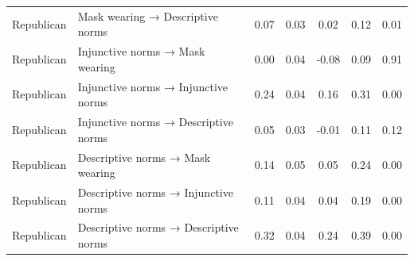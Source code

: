 \documentclass[
  man, donotrepeattitle,floatsintext]{apa6}
\begin{document}
\begin{center}
\begin{ThreePartTable}
\begin{longtable}{llccccc}
Republican & Mask wearing → Descriptive norms & 0.07 & 0.03 & 0.02 & 0.12 & 0.01\\
Republican & Injunctive norms → Mask wearing & 0.00 & 0.04 & -0.08 & 0.09 & 0.91\\
Republican & Injunctive norms → Injunctive norms & 0.24 & 0.04 & 0.16 & 0.31 & 0.00\\
Republican & Injunctive norms → Descriptive norms & 0.05 & 0.03 & -0.01 & 0.11 & 0.12\\
Republican & Descriptive norms → Mask wearing & 0.14 & 0.05 & 0.05 & 0.24 & 0.00\\
Republican & Descriptive norms → Injunctive norms & 0.11 & 0.04 & 0.04 & 0.19 & 0.00\\
Republican & Descriptive norms → Descriptive norms & 0.32 & 0.04 & 0.24 & 0.39 & 0.00\\
\bottomrule
\end{longtable}

\end{ThreePartTable}
\end{center}
\end{document}
